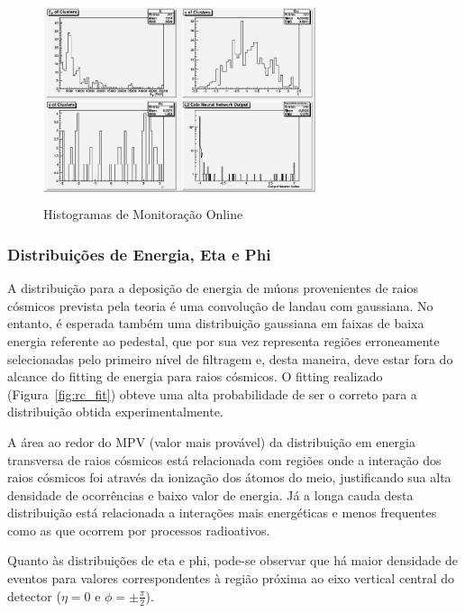 \documentclass[a4paper,10pt,titlepage]{article}
\begin{document}
\begin{figure}[htbp!]
 \centering
 \includegraphics[width=8cm,height=6cm]{Figs/cosmics/rc_dqm.jpeg}
 \caption{Histogramas de Monitoração Online}
 \label{fig:rc_dqm}
\end{figure}

\subsubsection{Distribuições de Energia, Eta e Phi}

A distribuição para a deposição de energia de múons provenientes de raios cósmicos prevista pela teoria é uma convolução de landau com gaussiana.
No entanto, é esperada também uma distribuição gaussiana em faixas de baixa energia referente ao pedestal, que por sua vez representa regiões erroneamente selecionadas pelo primeiro nível de filtragem e, desta maneira, deve estar fora do alcance do fitting de energia para raios cósmicos.
O fitting realizado (Figura~\ref{fig:rc_fit}) obteve uma alta probabilidade de ser o correto para a distribuição obtida experimentalmente.

A área ao redor do MPV (valor mais provável) da distribuição em energia transversa de raios cósmicos está relacionada com regiões onde a interação dos raios cósmicos foi através da ionização dos átomos do meio, justificando sua alta densidade de ocorrências e baixo valor de energia.
Já a longa cauda desta distribuição está relacionada a interações mais energéticas e menos frequentes como as que ocorrem por processos radioativos.

Quanto às distribuições de eta e phi, pode-se observar que há maior densidade de eventos para valores correspondentes à região próxima ao eixo vertical central do detector ($\eta = 0$ e $\phi = \pm \frac{\pi}{2}$).
\end{document}
